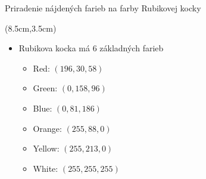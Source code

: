 \documentclass[red]{beamer}
\begin{document}
\begin{frame}{Priradenie nájdených farieb na farby Rubikovej kocky}
\begin{textblock*}{3cm}(8.5cm,3.5cm)
\end{textblock*}
\begin{itemize}
\item<2->{Rubikova kocka má 6 základných farieb}
    \begin{itemize}
    \item<2-> Red: $(196, 30, 58)$
    \item<2-> Green: $(0, 158, 96)$
    \item<2-> Blue: $(0, 81, 186)$
    \item<2-> Orange: $(255, 88, 0)$
    \item<2-> Yellow: $(255, 213, 0)$
    \item<2-> White: $(255, 255, 255)$
    \end{itemize}
\end{itemize}
\end{frame}
\end{document}
